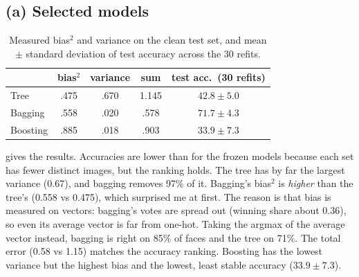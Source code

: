 \documentclass[10pt,twocolumn,letterpaper]{article}
\begin{document}
\subsection{(a) Selected models}
\begin{table}[t]
\centering\small
\begin{tabular}{lcccc}
\toprule
& bias$^2$ & variance & sum & test acc.\ (30 refits)\\
\midrule
Tree     & .475 & .670 & 1.145 & $42.8 \pm 5.0$\\
Bagging  & .558 & .020 & .578  & $71.7 \pm 4.3$\\
Boosting & .885 & .018 & .903  & $33.9 \pm 7.3$\\
\bottomrule
\end{tabular}
\caption{Measured bias$^2$ and variance on the clean test set, and mean $\pm$
standard deviation of test accuracy across the 30 refits.}
\label{tab:q3a}
\end{table}

 gives the results. Accuracies are lower than for the frozen
models because each set has fewer distinct images, but the ranking holds. The
tree has by far the largest variance (0.67), and bagging removes 97\% of it.
Bagging's bias$^2$ is \emph{higher} than the tree's (0.558 vs 0.475), which
surprised me at first. The reason is that bias is measured on vectors: bagging's
votes are spread out (winning share about 0.36), so even its average vector is
far from one-hot. Taking the argmax of the average vector instead, bagging is
right on 85\% of faces and the tree on 71\%. The total error (0.58 vs 1.15)
matches the accuracy ranking. Boosting has the lowest variance but the highest
bias and the lowest, least stable accuracy ($33.9\pm7.3$).
\end{document}
